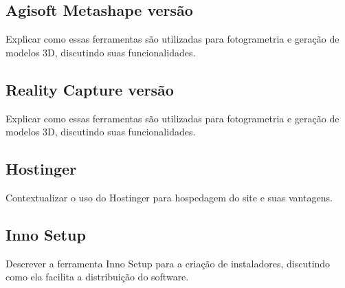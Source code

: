 \subsection{Agisoft Metashape versão}
Explicar como essas ferramentas são utilizadas para fotogrametria e geração de modelos 3D, discutindo suas funcionalidades.

\subsection{Reality Capture versão}
Explicar como essas ferramentas são utilizadas para fotogrametria e geração de modelos 3D, discutindo suas funcionalidades.

\subsection{Hostinger}
Contextualizar o uso do Hostinger para hospedagem do site e suas vantagens.

\subsection{Inno Setup}
Descrever a ferramenta Inno Setup para a criação de instaladores, discutindo como ela facilita a distribuição do software.


